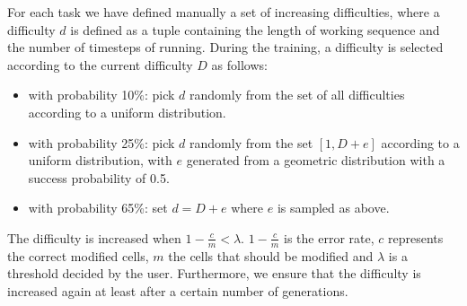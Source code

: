 For each task we have defined manually a set of increasing difficulties, where a difficulty $d$ is defined as a tuple containing the length of working sequence and the number of timesteps of running. During the training, a difficulty is selected according to the current difficulty $D$ as follows:
\begin{itemize}
	\item{with probability 10\%: pick $d$ randomly from the set of all difficulties according to a uniform distribution.}
	\item{with probability 25\%: pick $d$ randomly from the set $[1, D + e]$ according to a uniform distribution, with $e$ generated from a geometric distribution with a success probability of 0.5.}
	\item{with probability 65\%: set $d = D + e$ where $e$ is sampled as above.}
\end{itemize}
The difficulty is increased when $1 - \frac{c}{m} < \lambda$. $1 - \frac{c}{m}$ is the error rate, $c$ represents the correct modified cells, $m$ the cells that should be modified and $\lambda$ is a threshold decided by the user. Furthermore, we ensure that the difficulty is increased again at least after a certain number of generations.


